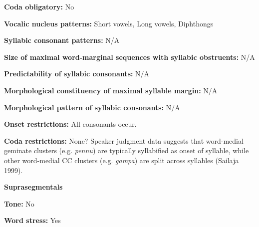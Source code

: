 \begin{styleBody}
\textbf{Coda obligatory:} No
\end{styleBody}

\begin{styleBody}
\textbf{Vocalic nucleus patterns:} Short vowels, Long vowels, Diphthongs
\end{styleBody}

\begin{styleBody}
\textbf{Syllabic consonant patterns:} N/A
\end{styleBody}

\begin{styleBody}
\textbf{Size of maximal word{}-marginal sequences with syllabic obstruents:} N/A
\end{styleBody}

\begin{styleBody}
\textbf{Predictability of syllabic consonants:} N/A
\end{styleBody}

\begin{styleBody}
\textbf{Morphological constituency of maximal syllable margin:} N/A
\end{styleBody}

\begin{styleBody}
\textbf{Morphological pattern of syllabic consonants:} N/A
\end{styleBody}

\begin{styleBody}
\textbf{Onset restrictions:} All consonants occur. 
\end{styleBody}

\begin{styleBody}
\textbf{Coda restrictions:} None? Speaker judgment data suggests that word-medial geminate clusters (e.g. \textit{pennu}) are typically syllabified as onset of syllable, while other word-medial CC clusters (e.g. \textit{gampa}) are split across syllables (Sailaja 1999).
\end{styleBody}

\begin{styleBody}
\textbf{Suprasegmentals}
\end{styleBody}

\begin{styleBody}
\textbf{Tone:} No
\end{styleBody}

\begin{styleBody}
\textbf{Word stress:} Yes
\end{styleBody}

